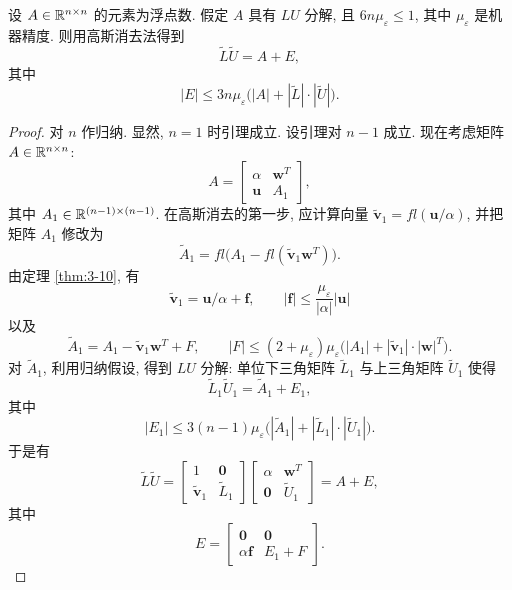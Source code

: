 \begin{lemma}
\label{lem:3-1}
设 $A\in\mathbb{R}^{n\times n}$ 的元素为浮点数. 假定 $A$ 具有 $LU$ 分解, 且 $6n\mu_\varepsilon\leqslant1$, 其中 $\mu_\varepsilon$ 是机器精度. 则用高斯消去法得到
\[
  \widetilde{L}\widetilde{U}=A+E,
\]
其中
\[
  |E|\leqslant3n\mu_\varepsilon\bigl(|A|+|\widetilde{L}|\cdot|\widetilde{U}|\bigr).
\]
\end{lemma}

\begin{proof}
对 $n$ 作归纳. 显然, $n=1$ 时引理成立. 设引理对 $n-1$ 成立. 现在考虑矩阵 $A\in\mathbb{R}^{n\times n}$:
\[
  A=
  \begin{bmatrix}
    \alpha & \mathbf{w}^T\\
    \mathbf{u} & A_1
  \end{bmatrix},
\]
其中 $A_1\in\mathbb{R}^{(n-1)\times(n-1)}$. 在高斯消去的第一步, 应计算向量 $\tilde{\mathbf{v}}_1=fl(\mathbf{u}/\alpha)$, 并把矩阵 $A_1$ 修改为
\[
  \widetilde{A}_1=fl\bigl(A_1-fl(\tilde{\mathbf{v}}_1\mathbf{w}^T)\bigr).
\]
由定理 \ref{thm:3-10}, 有
\begin{equation}
  \tilde{\mathbf{v}}_1=\mathbf{u}/\alpha+\mathbf{f},
  \qquad|\mathbf{f}|\leqslant\frac{\mu_\varepsilon}{|\alpha|}|\mathbf{u}|
  \label{eq:3-13}
\end{equation}
以及
\begin{equation}
  \widetilde{A}_1=A_1-\tilde{\mathbf{v}}_1\mathbf{w}^T+F,
  \qquad|F|\leqslant(2+\mu_\varepsilon)\mu_\varepsilon
  \bigl(|A_1|+|\tilde{\mathbf{v}}_1|\cdot|\mathbf{w}|^T\bigr).
  \label{eq:3-14}
\end{equation}
对 $\widetilde{A}_1$, 利用归纳假设, 得到 $LU$ 分解: 单位下三角矩阵 $\widetilde{L}_1$ 与上三角矩阵 $\widetilde{U}_1$ 使得
\[
  \widetilde{L}_1\widetilde{U}_1=\widetilde{A}_1+E_1,
\]
其中
\[
  |E_1|\leqslant3(n-1)\mu_\varepsilon
  \bigl(|\widetilde{A}_1|+|\widetilde{L}_1|\cdot|\widetilde{U}_1|\bigr).
\]
于是有
\[
  \widetilde{L}\widetilde{U}
  =
  \begin{bmatrix}
    1 & \mathbf{0}\\
    \tilde{\mathbf{v}}_1 & \widetilde{L}_1
  \end{bmatrix}
  \begin{bmatrix}
    \alpha & \mathbf{w}^T\\
    \mathbf{0} & \widetilde{U}_1
  \end{bmatrix}
  =A+E,
\]
其中
\[
  E=
  \begin{bmatrix}
    \mathbf{0} & \mathbf{0}\\
    \alpha\mathbf{f} & E_1+F
  \end{bmatrix}.
\]
\end{proof}
